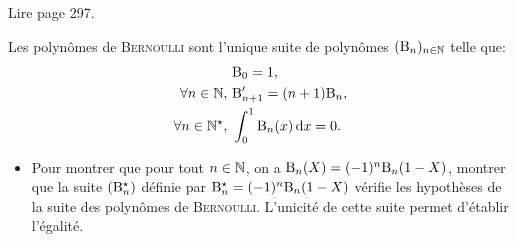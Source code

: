 Lire \cite{calcul_infinitesimal} page 297.
\begin{tcolorbox}
    Les polynômes de \textsc{Bernoulli} sont l'unique suite de polynômes $(\mathrm{B}_n)_{n \in \mathbb{N}}$ telle que:
    \begin{align*}
        &\mathrm{B}_0 = 1, \\
        \forall n \in \mathbb{N},\ &\mathrm{B}'_{n+1} = (n+1)\mathrm{B}_n, \\
        \forall n \in \mathbb{N}^\star,\ &\int_{0}^{1} \mathrm{B}_n(x) \, \mathrm{d} x = 0.
    \end{align*}
\end{tcolorbox}

\begin{itemize}
    \item Pour montrer que pour tout $n \in \mathbb{N}$, on a $\mathrm{B}_n(X)=(-1)^n \mathrm{B}_n(1-X)$, montrer que la suite $(\mathrm{B}_n^{\star})$ définie par $\mathrm{B}_n^{\star} = (-1)^n \mathrm{B}_n(1-X)$ vérifie les hypothèses de la suite des polynômes de \textsc{Bernoulli}. L'unicité de cette suite permet d'établir l'égalité. 
\end{itemize}